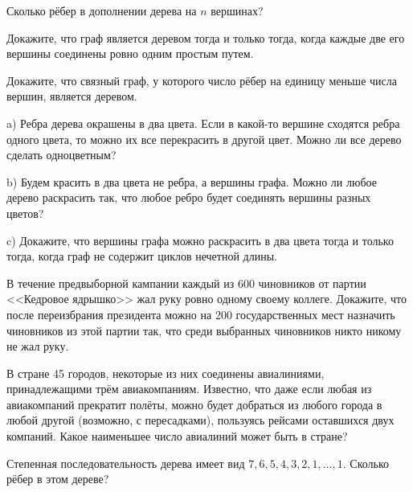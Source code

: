 \begin{exersize}
	Сколько рёбер в дополнении дерева на $n$ вершинах?	
\end{exersize}	

\begin{exersize}
	Докажите, что граф является деревом тогда и только тогда, когда каждые две его вершины соединены ровно одним простым путем.
\end{exersize}	

\begin{exersize}
Докажите, что связный граф, у которого число рёбер на единицу меньше числа вершин, является деревом.
\end{exersize}

\begin{exersize}
	a) Ребра дерева окрашены в два цвета. Если в какой-то вершине сходятся ребра одного цвета, то можно их все перекрасить в другой цвет. Можно ли все дерево сделать одноцветным?
	
	b) Будем красить в два цвета не ребра, а вершины графа. Можно ли любое дерево раскрасить так, что любое ребро будет соединять вершины разных цветов?
	
	c) Докажите, что вершины графа можно раскрасить в два цвета тогда и только тогда, когда граф не содержит циклов нечетной длины.
\end{exersize}	

\begin{exersize}
	В течение предвыборной кампании каждый из 600 чиновников от партии <<Кедровое ядрышко>> жал руку ровно одному своему коллеге. Докажите, что после переизбрания президента можно на 200 государственных мест назначить чиновников из этой партии так, что среди выбранных чиновников никто никому не жал руку.
\end{exersize}	

\begin{exersize}
	В стране 45 городов, некоторые из них соединены авиалиниями, принадлежащими трём авиакомпаниям. Известно, что даже если любая из авиакомпаний прекратит полёты, можно будет добраться из любого города в любой другой (возможно, с пересадками), пользуясь рейсами оставшихся двух компаний. Какое наименьшее число авиалиний может быть в стране?
\end{exersize}	

\begin{exersize}
	Степенная последовательность дерева имеет вид $7, 6, 5, 4, 3, 2, 1, \dots, 1$. Сколько рёбер в этом дереве?
\end{exersize}	

